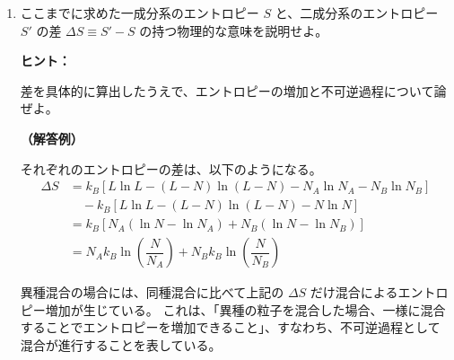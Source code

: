\documentclass[uplatex,dvipdfmx,a4paper,11pt]{jsarticle}
\begin{document}
\begin{enumerate}
\begin{itembox}[l]{{\bf ヒント：}}
\end{itembox}

{\bf （解答例）}

この設問の場合、全系の微視的状態数 $W'$ は、総数が $L$ である空間格子上に同一の見分けの付かない $N_A$ をばらまいたうえで、残った格子上に、
$N_B$ 個の粒子をばらまく場合の組み合わせで表されることになり、
\begin{align*}
W' 
	&= {}_L C_{N_A} \times {}_{(L-N_A)} C_{N_B} \\
	&= \dfrac{L!}{(L-N_A)! N_A!} \times \dfrac{(L-N_A)!}{(L-N_A-N_B)! N_B!} \\
	&= \dfrac{L!}{(L-N_A-N_B)! N_A! N_B!} 
\end{align*}
で表される。

したがって、求めるエントロピーは、ボルツマンの関係式から、
\begin{align*}
S' 
	&= k_B \ln W' \\
	&= k_B \ln \left[ \dfrac{L!}{(L-N_A-N_B)! N_A! N_B!} \right] \\
	&= k_B \left[ \ln L! - \ln (L-N_A-N_B)! - \ln N_A! - \ln N_B! \}\right] \\
	&\simeq k_B \left[ \{ L\ln L -L\} - \{ (L-N_A-N_B)\ln (L-N_A-N_B) - (L-N_A -N_B) \} \right. \\
	&\quad \left. - \{N_A\ln N_A -N_A \} - \{N_B\ln N_B -N_B \} \right] \\
	&= k_B \left[ L\ln L - (L-N)\ln (L-N) - N_A\ln N_A - N_B\ln N_B \right]
\end{align*}
となる。


\newpage

\item
ここまでに求めた一成分系のエントロピー $S$ と、二成分系のエントロピー $S'$ の差 $\Delta S \equiv S' - S$ の持つ物理的な意味を説明せよ。

\begin{itembox}[l]{{\bf ヒント：}}

差を具体的に算出したうえで、エントロピーの増加と不可逆過程について論ぜよ。

\end{itembox}

{\bf （解答例）}

それぞれのエントロピーの差は、以下のようになる。
\begin{align*}
\Delta S 
	&= k_B \left[ L\ln L - (L-N)\ln (L-N) - N_A\ln N_A - N_B\ln N_B \right] \\
	&\quad - k_B \left[ L\ln L - (L-N)\ln (L-N) - N\ln N \right] \\
	&= k_B [N_A ( \ln N - \ln N_A) + N_B ( \ln N - \ln N_B)] \\
	&= N_A k_B \ln \left( \dfrac{N}{N_A} \right) + N_B k_B \ln \left( \dfrac{N}{N_B} \right)
\end{align*}

異種混合の場合には、同種混合に比べて上記の $\Delta S$ だけ混合によるエントロピー増加が生じている。
これは、「異種の粒子を混合した場合、一様に混合することでエントロピーを増加できること」、すなわち、不可逆過程として混合が進行することを表している。

\end{enumerate}
\end{document}
